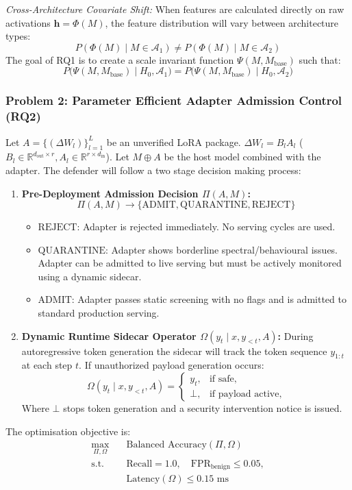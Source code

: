 \noindent\textit{Cross-Architecture Covariate Shift:} When features are calculated directly on raw activations $\mathbf{h} = \Phi(M)$, the feature distribution will vary between architecture types:
\begin{equation}
P(\Phi(M) \mid M \in \mathcal{A}_1) \neq P(\Phi(M) \mid M \in \mathcal{A}_2)
\end{equation}
The goal of RQ1 is to create a scale invariant function $\Psi(M, M_{\text{base}})$ such that:
\begin{equation}
P\big(\Psi(M, M_{\text{base}}) \mid H_0, \mathcal{A}_1\big) = P\big(\Psi(M, M_{\text{base}}) \mid H_0, \mathcal{A}_2\big)
\end{equation}

\subsubsection{Problem 2: Parameter Efficient Adapter Admission Control (RQ2)}
Let $A = \{(\Delta W_l)\}_{l=1}^L$ be an unverified LoRA package. $\Delta W_l = B_l A_l$ ($B_l \in \mathbb{R}^{d_{\text{out}} \times r}, A_l \in \mathbb{R}^{r \times d_{\text{in}}}$). Let $M \oplus A$ be the host model combined with the adapter. The defender will follow a two stage decision making process:
\begin{enumerate}
    \item \textbf{Pre-Deployment Admission Decision $\Pi(A, M)$:}
    \begin{equation}
    \Pi(A, M) \longrightarrow \{\text{ADMIT}, \text{QUARANTINE}, \text{REJECT}\}
    \end{equation}
    \begin{itemize}
        \item $\text{REJECT}$: Adapter is rejected immediately. No serving cycles are used.
        \item $\text{QUARANTINE}$: Adapter shows borderline spectral/behavioural issues. Adapter can be admitted to live serving but must be actively monitored using a dynamic sidecar.
        \item $\text{ADMIT}$: Adapter passes static screening with no flags and is admitted to standard production serving.
    \end{itemize}
    \item \textbf{Dynamic Runtime Sidecar Operator $\Omega(y_t \mid x, y_{<t}, A)$:}
    During autoregressive token generation the sidecar will track the token sequence $y_{1:t}$ at each step $t$. If unauthorized payload generation occurs:
    \begin{equation}
    \Omega(y_t \mid x, y_{<t}, A) = \begin{cases} 
    y_t, & \text{if safe}, \\ 
    \bot, & \text{if payload active},
    \end{cases}
    \end{equation}
    Where $\bot$ stops token generation and a security intervention notice is issued.
\end{enumerate}

The optimisation objective is:
\begin{align}
\max_{\Pi, \Omega} \quad & \text{Balanced Accuracy}(\Pi, \Omega) \nonumber \\
\text{s.t.} \quad & \text{Recall} = 1.0, \quad \text{FPR}_{\text{benign}} \le 0.05, \nonumber \\
& \text{Latency}(\Omega) \le 0.15\text{ ms}
\end{align}
